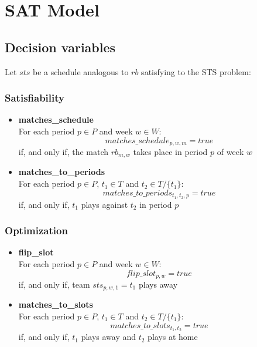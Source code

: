 \section{SAT Model}
\subsection{Decision variables}
Let $sts$ be a schedule analogous to $rb$ satisfying to the STS problem:

\subsubsection{Satisfiability}
\begin{itemize}
    \item \textbf{matches\_schedule}\\
        For each period $p \in P$ and week $w \in W$:
        $$
        matches\_schedule_{p, w, m} = true
        $$
        if, and only if, the match $rb_{m, w}$ takes place in period $p$ of week $w$
    \item \textbf{matches\_to\_periods}\\
        For each period $p \in P$, $t_1 \in T$ and $t_2 \in T/\{t_1\}$:
        $$
        matches\_to\_periods_{t_1, t_2, p} = true
        $$
        if, and only if, $t_1$ plays against $t_2$ in period $p$
\end{itemize}
\subsubsection{Optimization}
\begin{itemize}
    \item \textbf{flip\_slot}\\
        For each period $p \in P$ and week $w \in W$:
        $$
        flip\_slot_{p, w} = true
        $$
        if, and only if, team $sts_{p, w, 1} = t_1$ plays away
    \item \textbf{matches\_to\_slots}\\
        For each period $p \in P$, $t_1 \in T$ and $t_2 \in T/\{t_1\}$:
        $$
        matches\_to\_slots_{t_1, t_2} = true
        $$
        if, and only if, $t_1$ plays away and $t_2$ plays at home
\end{itemize}


